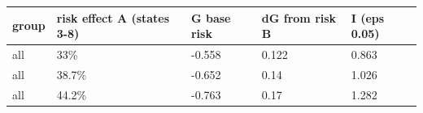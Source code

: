 \begingroup\small
\setlength{\tabcolsep}{3pt}
\renewcommand{\arraystretch}{1.04}
\begin{tabularx}{\linewidth}{XXXXX}
\toprule
group & risk effect A (states 3-8) & G base risk & dG from risk B & I (eps 0.05) \\
\midrule
all & 33\% & -0.558 & 0.122 & 0.863 \\
all & 38.7\% & -0.652 & 0.14 & 1.026 \\
all & 44.2\% & -0.763 & 0.17 & 1.282 \\
\bottomrule
\end{tabularx}
\endgroup
